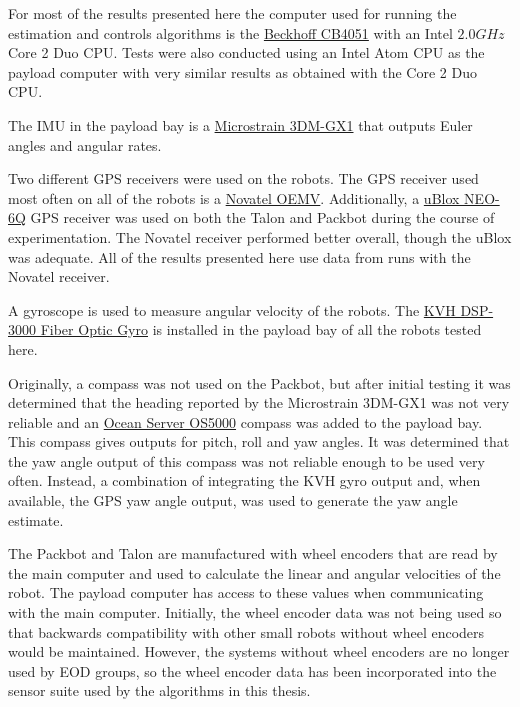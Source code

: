 For most of the results presented here the computer used for running the estimation and controls algorithms is the \href{http://www.beckhoff.com/english.asp?motherboards/cb4051.htm}{Beckhoff CB4051} with an Intel $2.0 GHz$ Core 2 Duo CPU. Tests were also conducted using an Intel Atom CPU as the payload computer with very similar results as obtained with the Core 2 Duo CPU.

The IMU in the payload bay is a \href{http://www.microstrain.com/3dm-gx1.aspx}{Microstrain 3DM-GX1} that outputs Euler angles and angular rates.

Two different GPS receivers were used on the robots. The GPS receiver used most often on all of the robots is a \href{http://www.novatel.com/products/gnss-receivers/oem-receiver-boards/oemv-receivers/}{Novatel OEMV}. Additionally, a \href{http://www.u-blox.com/gps-modules.html}{uBlox NEO-6Q} GPS receiver was used on both the Talon and Packbot during the course of experimentation. The Novatel receiver performed better overall, though the uBlox  was adequate. All of the results presented here use data from runs with the Novatel receiver.

A gyroscope is used to measure angular velocity of the robots. The \href{http://www.kvh.com/Commercial-and-OEM/Gyros-and-Inertial-Systems-and-Compasses/Gyros-and-IMUs-and-INS/Fiber-Optic-Gyros/DSP-3000.aspx}{KVH DSP-3000 Fiber Optic Gyro} is installed in the payload bay of all the robots tested here.

Originally, a compass was not used on the Packbot, but after initial testing it was determined that the heading reported by the Microstrain 3DM-GX1 was not very reliable and an \href{http://www.oceanserver-store.com/os3axdico3.html}{Ocean Server OS5000} compass was added to the payload bay. This compass gives outputs for pitch, roll and yaw angles. It was determined that the yaw angle output of this compass was not reliable enough to be used very often. Instead, a combination of integrating the KVH gyro output and, when available, the GPS yaw angle output, was used to generate the yaw angle estimate.

The Packbot and Talon are manufactured with wheel encoders that are read by the main computer and used to calculate the linear and angular velocities of the robot. The payload computer has access to these values when communicating with the main computer. Initially, the wheel encoder data was not being used so that backwards compatibility with other small robots without wheel encoders would be maintained. However, the systems without wheel encoders are no longer used by EOD groups, so the wheel encoder data has been incorporated into the sensor suite used by the algorithms in this thesis.

